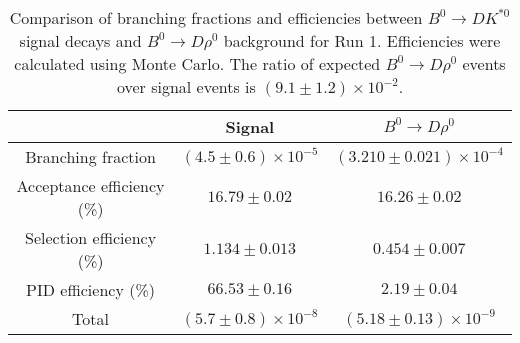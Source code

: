 \begin{table}
    \centering
    \begin{tabular}{ccc}
        \toprule
        & Signal & $B^0 \to D\rho^0$ \\
        \midrule
        Branching fraction & $(4.5 \pm 0.6) \times 10^{-5}$ & $(3.210 \pm 0.021) \times 10^{-4}$ \\
        Acceptance efficiency (\%) & $16.79 \pm 0.02$ & $16.26 \pm 0.02$ \\
        Selection efficiency (\%) & $1.134 \pm 0.013$ & $0.454 \pm 0.007$ \\
        PID efficiency (\%) & $66.53 \pm 0.16$ & $2.19 \pm 0.04$ \\
        \midrule
        Total & $(5.7 \pm 0.8) \times 10^{-8}$ & $(5.18 \pm 0.13) \times 10^{-9}$ \\
        \bottomrule
        \end{tabular}
        \caption{Comparison of branching fractions and efficiencies between $B^0 \to DK^{*0}$ signal decays and $B^0 \to D\rho^0$ background for Run 1. Efficiencies were calculated using Monte Carlo. The ratio of expected $B^0 \to D\rho^0$ events over signal events is $(9.1 \pm 1.2) \times 10^{-2}$.}
\label{tab:rho_efficiency_run1}
\end{table}
